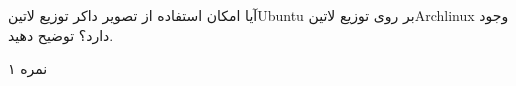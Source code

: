 
آیا امکان استفاده از تصویر داکر توزیع ‌لاتین{Ubuntu} بر روی توزیع ‌لاتین{Archlinux} وجود دارد؟ توضیح دهید.

۱ نمره
